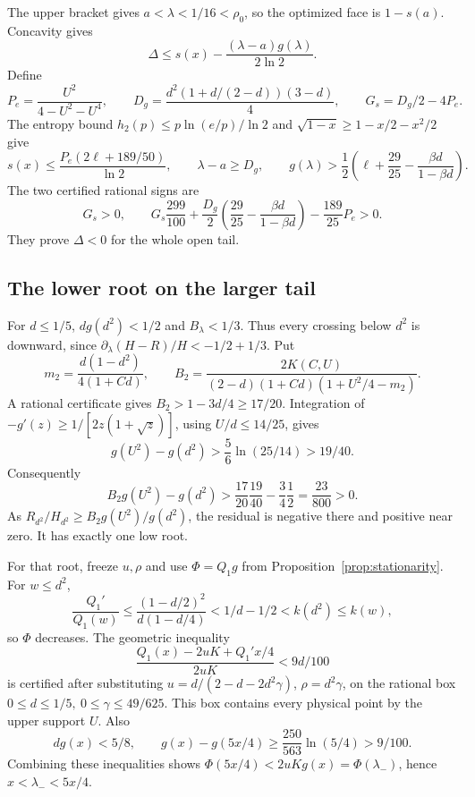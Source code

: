 \documentclass[12pt,letterpaper,onecolumn]{article}
\theoremstyle{definition}
\begin{document}
The upper bracket gives \(a<\lambda<1/16<\rho_0\), so the optimized face is \(1-s(a)\).
Concavity gives
\[
\Delta\le s(x)-\frac{(\lambda-a)g(\lambda)}{2\ln2}.
\]
Define
\[
P_e=\frac{U^2}{4-U^2-U^4},\qquad
D_g=\frac{d^2(1+d/(2-d))(3-d)}4,\qquad G_s=D_g/2-4P_e.
\]
The entropy bound \(h_2(p)\le p\ln(e/p)/\ln2\) and
\(\sqrt{1-x}\ge1-x/2-x^2/2\) give
\[
s(x)\le \frac{P_e(2\ell+189/50)}{\ln2},\qquad
\lambda-a\ge D_g,\qquad
g(\lambda)>\frac12\left(\ell+\frac{29}{25}
-\frac{\beta d}{1-\beta d}\right).
\]
The two certified rational signs are
\begin{equation}\label{eq:valuecert}
G_s>0,\qquad
G_s\frac{299}{100}
+\frac{D_g}{2}\left(\frac{29}{25}-\frac{\beta d}{1-\beta d}\right)
-\frac{189}{25}P_e>0.
\end{equation}
They prove \(\Delta<0\) for the whole open tail.

\subsection{The lower root on the larger tail}
For \(d\le1/5\), \(dg(d^2)<1/2\) and \(B_\lambda<1/3\).
Thus every crossing below \(d^2\) is downward, since
\(\partial_\lambda(H-R)/H<-1/2+1/3\).
Put
\[
m_2=\frac{d(1-d^2)}{4(1+Cd)},\qquad
B_2=\frac{2K(C,U)}{(2-d)(1+Cd)(1+U^2/4-m_2)}.
\]
A rational certificate gives \(B_2>1-3d/4\ge17/20\).
Integration of \(-g'(z)\ge1/[2z(1+\sqrt z)]\), using \(U/d\le14/25\), gives
\[
g(U^2)-g(d^2)>\frac56\ln(25/14)>19/40.
\]
Consequently
\[
B_2g(U^2)-g(d^2)>
\frac{17}{20}\frac{19}{40}-\frac34\frac12
=\frac{23}{800}>0.
\]
As \(R_{d^2}/H_{d^2}\ge B_2g(U^2)/g(d^2)\), the residual is negative there and positive near zero. It has exactly one low root.

For that root, freeze \(u,\rho\) and use \(\Phi=Q_1g\) from Proposition~\ref{prop:stationarity}.
For \(w\le d^2\),
\[
\frac{Q_1'}{Q_1(w)}
\le\frac{(1-d/2)^2}{d(1-d/4)}
<1/d-1/2<k(d^2)\le k(w),
\]
so \(\Phi\) decreases.
The geometric inequality
\begin{equation}\label{eq:lowergeometry}
\frac{Q_1(x)-2uK+Q_1'x/4}{2uK}<9d/100
\end{equation}
is certified after substituting \(u=d/(2-d-2d^2\gamma)\),
\(\rho=d^2\gamma\), on the rational box
\(0\le d\le1/5,\ 0\le\gamma\le49/625\).
This box contains every physical point by the upper support \(U\).
Also
\[
dg(x)<5/8,\qquad
g(x)-g(5x/4)\ge\frac{250}{563}\ln(5/4)>9/100.
\]
Combining these inequalities shows
\(\Phi(5x/4)<2uKg(x)=\Phi(\lambda_-)\), hence
\(x<\lambda_-<5x/4\).
\end{document}
